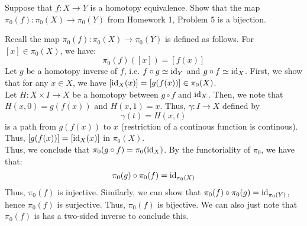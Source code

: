\documentclass[12pt]{article}
\begin{document}


\begin{problem}{1}
    Suppose that $f: X \to Y$ is a homotopy equivalence. Show that the map $\pi_0(f): \pi_0(X) \to \pi_0(Y)$ from Homework 1, Problem 5 is a bijection.
\end{problem}
\begin{solution}
    Recall the map $\pi_0(f): \pi_0(X) \to \pi_0(Y)$ is defined as follows. For $[x] \in \pi_0(X)$, we have:
    \[ \pi_0(f)([x]) = [f(x)] \]
    Let $g$ be a homotopy inverse of $f$, i.e. $f \circ g \simeq \operatorname{id}_Y$ and $g \circ f \simeq \operatorname{id}_X$. First, we show that for any $x \in X$, we have $[\operatorname{id}_X(x)] = [g(f(x))] \in \pi_0(X)$. \\
    Let $H: X \times I \to X$ be a homotopy between $g \circ f$ and $\operatorname{id}_X$. Then, we note that $H(x, 0) = g(f(x))$ and $H(x, 1) = x$. Thus, $\gamma: I \to X$ defined by 
    \[ \gamma(t) = H(x, t)\]
    is a path from $g(f(x))$ to $x$ (restriction of a continous function is continous). Thus, $[g(f(x))] = [\operatorname{id}_X(x)]$ in $\pi_0(X)$. \\
    Thus, we conclude that $\pi_0(g \circ f) = \pi_0(\operatorname{id}_X)$. By the functoriality of $\pi_0$, we have that: 
    \[\pi_0(g) \circ \pi_0(f) = \operatorname{id}_{\pi_0(X)}\]
    Thus, $\pi_0(f)$ is injective. Similarly, we can show that $\pi_0(f) \circ \pi_0(g) = \operatorname{id}_{\pi_0(Y)}$, hence $\pi_0(f)$ is surjective. Thus, $\pi_0(f)$ is bijective. We can also just note that $\pi_0(f)$ is has a two-sided inverse to conclude this.
\end{solution}
\newpage
\end{document}
